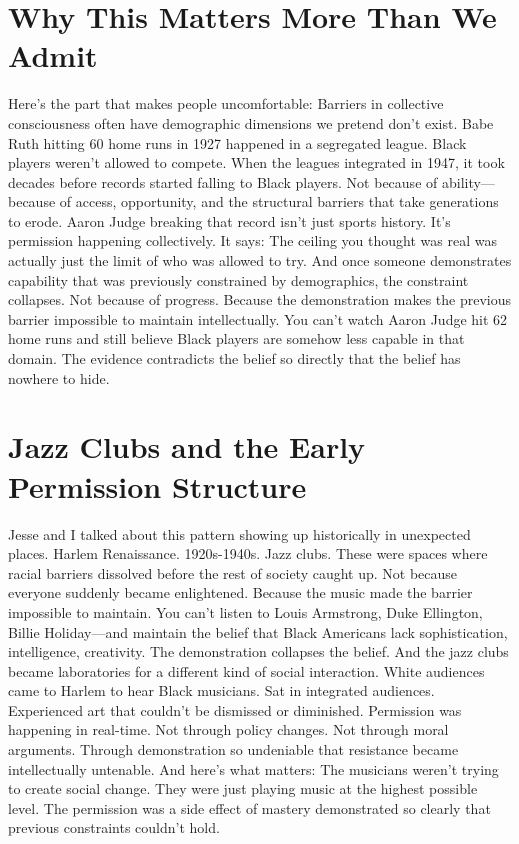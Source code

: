 \section{Why This Matters More Than We Admit}

Here's the part that makes people uncomfortable:
Barriers in collective consciousness often have demographic dimensions we pretend don't exist.
Babe Ruth hitting 60 home runs in 1927 happened in a segregated league. Black players weren't allowed to compete.
When the leagues integrated in 1947, it took decades before records started falling to Black players. Not because of ability—because of access, opportunity, and the structural barriers that take generations to erode.
Aaron Judge breaking that record isn't just sports history. It's permission happening collectively.
It says: The ceiling you thought was real was actually just the limit of who was allowed to try.
And once someone demonstrates capability that was previously constrained by demographics, the constraint collapses. Not because of progress. Because the demonstration makes the previous barrier impossible to maintain intellectually.
You can't watch Aaron Judge hit 62 home runs and still believe Black players are somehow less capable in that domain.
The evidence contradicts the belief so directly that the belief has nowhere to hide.

\section{Jazz Clubs and the Early Permission Structure}

Jesse and I talked about this pattern showing up historically in unexpected places.
Harlem Renaissance. 1920s-1940s. Jazz clubs.
These were spaces where racial barriers dissolved before the rest of society caught up. Not because everyone suddenly became enlightened. Because the music made the barrier impossible to maintain.
You can't listen to Louis Armstrong, Duke Ellington, Billie Holiday—and maintain the belief that Black Americans lack sophistication, intelligence, creativity.
The demonstration collapses the belief.
And the jazz clubs became laboratories for a different kind of social interaction. White audiences came to Harlem to hear Black musicians. Sat in integrated audiences. Experienced art that couldn't be dismissed or diminished.
Permission was happening in real-time.
Not through policy changes. Not through moral arguments. Through demonstration so undeniable that resistance became intellectually untenable.
And here's what matters:
The musicians weren't trying to create social change. They were just playing music at the highest possible level. The permission was a side effect of mastery demonstrated so clearly that previous constraints couldn't hold.

